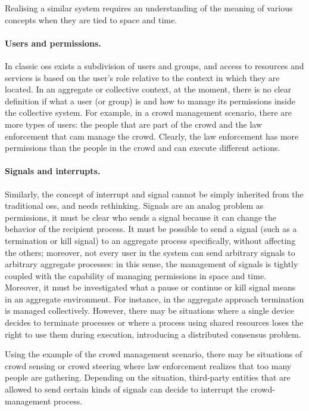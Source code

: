 \documentclass[12pt, a4paper]{article}
\begin{document}
Realising a similar system requires an understanding of the meaning of various concepts when they are tied to space and time.

\paragraph{Users and permissions.}
In classic \acp{os} exists a subdivision of users and groups,
and access to resources and services is based on the user's role relative to the context in which they are located.
%
In an aggregate or collective context,
at the moment,
there is no clear definition if what a user (or group) is and how to manage its permissions inside the collective system.
%
For example,
in a crowd management scenario,
there are more types of users: the people that are part of the crowd and the law enforcement that cam manage the crowd.
%
Clearly,
the law enforcement has more permissions than the people in the crowd and can execute different actions.
%

\paragraph{Signals and interrupts.}
Similarly, the concept of interrupt and signal cannot be simply inherited from the traditional \acp{os},
and needs rethinking.
%
Signals are an analog problem as permissions, it must be clear who sends a signal because it can
change the behavior of the recipient process.
%
It must be possible to send a signal (such as a termination or kill signal) to an aggregate process specifically,
without affecting the others;
moreover,
not every user in the system can send arbitrary signals to arbitrary aggregate processes:
in this sense,
the management of signals is tightly coupled with the capability of managing permissions in space and time.
%
Moreover,
it must be investigated what a pause or continue or kill signal means in an aggregate environment.
%
For instance,
in the aggregate approach termination is managed collectively.
%
However,
there may be situations where a single device decides to terminate processes or where a process using shared
resources loses the right to use them during execution,
introducing a distributed consensus problem.

Using the example of the crowd management scenario,
there may be situations of crowd sensing or crowd steering where law enforcement realizes that too many people are gathering.
%
Depending on the situation,
third-party entities that are allowed to send certain kinds of signals can decide to interrupt the crowd-management process.
\end{document}
